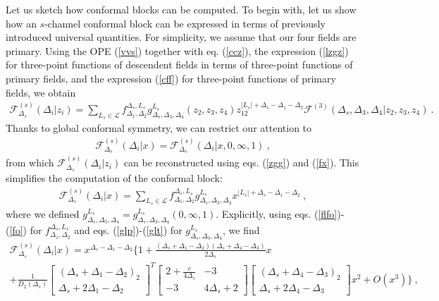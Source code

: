\documentclass[12pt,a4paper,notitlepage]{report}
\numberwithin{equation}{section}
\theoremstyle{break}
\begin{document}
Let us sketch how conformal blocks can be computed. 
To begin with, let us show how an $s$-channel conformal block can be expressed in terms of previously introduced universal quantities. For simplicity, we assume that our four fields are primary. Using the OPE (\ref{vvs}) together with eq. (\ref{ccz}), the expression (\ref{lzgz}) for three-point functions of descendent fields in terms of three-point functions of primary fields, and the expression (\ref{cff}) for three-point functions of primary fields, we obtain
\begin{align}
 \mathcal{F}^{(s)}_{\Delta_s}(\Delta_i|z_i) = \sum_{L_s\in\mathcal{L}} f_{\Delta_1,\Delta_2}^{\Delta_s,L_s} g^{L_s}_{\Delta_s,\Delta_3,\Delta_4}(z_2,z_3,z_4)z_{12}^{|L_s|+\Delta_s-\Delta_1-\Delta_2}\mathcal{F}^{(3)}(\Delta_s,\Delta_3,\Delta_4|z_2,z_3,z_4)\ .
\end{align}
Thanks to global conformal symmetry, we can restrict our attention to 
\begin{align}
 \mathcal{F}^{(s)}_{\Delta_s}(\Delta_i|x)=\mathcal{F}^{(s)}_{\Delta_s}(\Delta_i|x,0,\infty,1)\ ,
\end{align}
from which $\mathcal{F}^{(s)}_{\Delta_s}(\Delta_i|z_i)$ can be reconstructed using eqs. (\ref{zgg}) and (\ref{fx}).  This simplifies the computation of the conformal block:
\begin{align}
 \mathcal{F}^{(s)}_{\Delta_s}(\Delta_i|x) = \sum_{L_s\in\mathcal{L}} f_{\Delta_1,\Delta_2}^{\Delta_s,L_s} g^{L_s}_{\Delta_s,\Delta_3,\Delta_4}x^{|L_s|+\Delta_s-\Delta_1-\Delta_2}\ ,
\label{gsd}
\end{align}
where we defined $g^{L_s}_{\Delta_s,\Delta_3,\Delta_4} = g^{L_s}_{\Delta_s,\Delta_3,\Delta_4}(0,\infty,1)$. Explicitly, using eqs. (\ref{flfo})-(\ref{fo}) for $f_{\Delta_1,\Delta_2}^{\Delta_s,L_s}$ and eqs. (\ref{glp})-(\ref{glt}) for $g^{L_s}_{\Delta_s,\Delta_3,\Delta_4}$, we find 
\begin{multline}
 \mathcal{F}^{(s)}_{\Delta_s}(\Delta_i|x) 
= x^{\Delta_s - \Delta_1 - \Delta_2}\Bigg\{ 1 
+ \frac{(\Delta_s+\Delta_1-\Delta_2)(\Delta_s+\Delta_4-\Delta_3)}{2\Delta_s} x  
\\
+ \frac{1}{D_2(\Delta_s)}
\begin{bmatrix} (\Delta_s+\Delta_1-\Delta_2)_2 \\ \Delta_s+2\Delta_1-\Delta_2 \end{bmatrix}^T
\begin{bmatrix} 2+\frac{c}{4\Delta_s} & -3 \\ -3 & 4\Delta_s+2 \end{bmatrix}
\begin{bmatrix} (\Delta_s+\Delta_4-\Delta_3)_2 \\ \Delta_s+2\Delta_4-\Delta_3 \end{bmatrix}
 x^2 + O(x^3)\Bigg\}\ ,
\end{multline}
\end{document}
